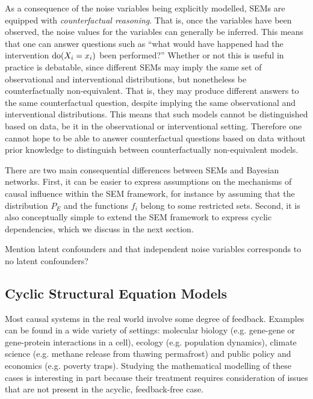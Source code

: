 As a consequence of the noise variables being explicitly modelled, SEMs are equipped with \emph{counterfactual reasoning}. 
That is, once the variables have been observed, the noise values for the variables can generally be inferred. 
This means that one can answer questions such as ``what would have happened had the intervention $\operatorname{do}(X_i=x_i)$ been performed?''
Whether or not this is useful in practice is debatable, since different SEMs may imply the same set of observational and interventional distributions, but nonetheless be counterfactually non-equivalent. That is, they may produce different answers to the same counterfactual question, despite implying the same observational and interventional distributions. This means that such models cannot be distinguished based on data, be it in the observational or interventional setting. Therefore one cannot hope to be able to answer counterfactual questions based 
on data without prior knowledge to distinguish between counterfactually non-equivalent models.


There are two main consequential differences between SEMs and Bayesian networks.
First, it can be easier to express assumptions on the mechanisms of causal influence within the SEM framework, for instance by assuming that the distribution $P_E$ and the functions $f_i$ belong to some restricted sets.
Second, it is also conceptually simple to extend the SEM framework to express cyclic dependencies, which we discuss in the next section.


Mention latent confounders and that independent noise variables corresponds to no latent confounders?

\subsection{Cyclic Structural Equation Models}

Most causal systems in the real world involve some degree of feedback. 
Examples can be found in a wide variety of settings: molecular biology (e.g. gene-gene or gene-protein interactions in a cell), ecology (e.g. population dynamics), climate science (e.g. methane release from thawing permafrost) and public policy and economics (e.g. poverty traps).
Studying the mathematical modelling of these cases is interesting in part because their treatment requires consideration of issues that are not present in the acyclic, feedback-free case.

